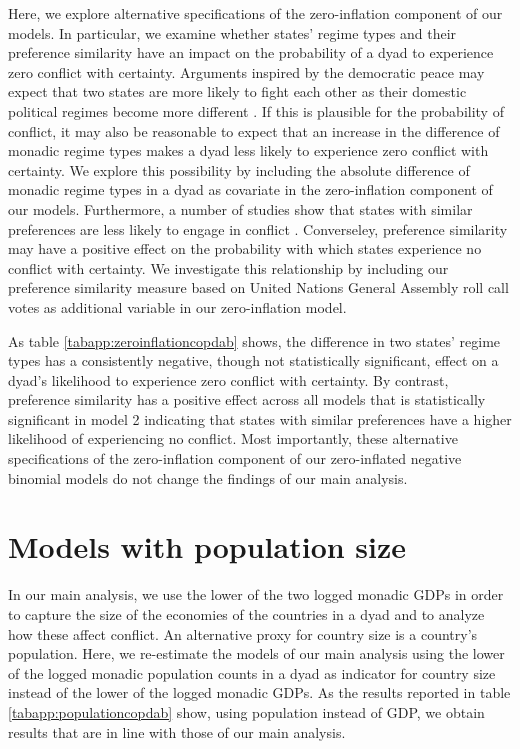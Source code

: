 \documentclass[12pt]{article}
\theoremstyle{hypothesis}
\begin{document}
Here, we explore alternative specifications of the zero-inflation component of our models. In particular, we examine whether states' regime types and their preference similarity have an impact on the probability of a dyad to experience zero conflict with certainty. Arguments inspired by the democratic peace may expect that two states are more likely to fight each other as their domestic political regimes become more different \citep{Gartzke:2013}. If this is plausible for the probability of conflict, it may also be reasonable to expect that an increase in the difference of monadic regime types makes a dyad less likely to experience zero conflict with certainty. We explore this possibility by including the absolute difference of monadic regime types in a dyad as covariate in the zero-inflation component of our models. Furthermore, a number of studies show that states with similar preferences are less likely to engage in conflict \citep{Gartzke:1998}. Converseley, preference similarity may have a positive effect on the probability with which states experience no conflict with certainty. We investigate this relationship by including our preference similarity measure based on United Nations General Assembly roll call votes as additional variable in our zero-inflation model.

As table \ref{tabapp:zeroinflationcopdab} shows, the difference in two states' regime types has a consistently negative, though not statistically significant, effect on a dyad's likelihood to experience zero conflict with certainty. By contrast, preference similarity has a positive effect across all models that is statistically significant in model 2 indicating that states with similar preferences have a higher likelihood of experiencing no conflict. Most importantly, these alternative specifications of the zero-inflation component of our zero-inflated negative binomial models do not change the findings of our main analysis.



\newpage

\section{Models with population size}

In our main analysis, we use the lower of the two logged monadic GDPs in order to capture the size of the economies of the countries in a dyad and to analyze how these affect conflict. An alternative proxy for country size is a country's population. Here, we re-estimate the models of our main analysis using the lower of the logged monadic population counts in a dyad as indicator for country size instead of the lower of the logged monadic GDPs. As the results reported in table \ref{tabapp:populationcopdab} show, using population instead of GDP, we obtain results that are in line with those of our main analysis.
\end{document}
